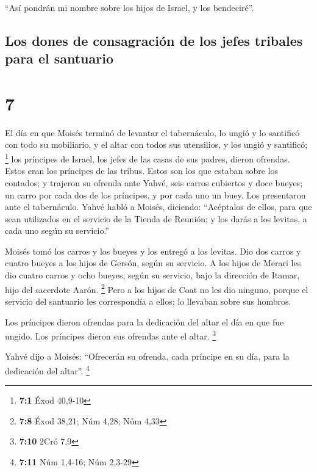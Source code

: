  ``Así pondrán mi nombre sobre los hijos de Israel, y los
bendeciré''.

\hypertarget{los-dones-de-consagraciuxf3n-de-los-jefes-tribales-para-el-santuario}{%
\subsection{Los dones de consagración de los jefes tribales para el
santuario}\label{los-dones-de-consagraciuxf3n-de-los-jefes-tribales-para-el-santuario}}

\hypertarget{section-6}{%
\section{7}\label{section-6}}

 El día en que Moisés terminó de levantar el tabernáculo,
lo ungió y lo santificó con todo su mobiliario, y el altar con todos sus
utensilios, y los ungió y santificó; \footnote{\textbf{7:1} Éxod 40,9-10}
 los príncipes de Israel, los jefes de las casas de sus
padres, dieron ofrendas. Estos eran los príncipes de las tribus. Estos
son los que estaban sobre los contados;  y trajeron su
ofrenda ante Yahvé, seis carros cubiertos y doce bueyes; un carro por
cada dos de los príncipes, y por cada uno un buey. Los presentaron ante
el tabernáculo.  Yahvé habló a Moisés, diciendo:
 ``Acéptalos de ellos, para que sean utilizados en el
servicio de la Tienda de Reunión; y los darás a los levitas, a cada uno
según su servicio.''

 Moisés tomó los carros y los bueyes y los entregó a los
levitas.  Dio dos carros y cuatro bueyes a los hijos de
Gersón, según su servicio.  A los hijos de Merari les dio
cuatro carros y ocho bueyes, según su servicio, bajo la dirección de
Itamar, hijo del sacerdote Aarón. \footnote{\textbf{7:8} Éxod 38,21; Núm
  4,28; Núm 4,33}  Pero a los hijos de Coat no les dio
ninguno, porque el servicio del santuario les correspondía a ellos; lo
llevaban sobre sus hombros.

 Los príncipes dieron ofrendas para la dedicación del
altar el día en que fue ungido. Los príncipes dieron sus ofrendas ante
el altar. \footnote{\textbf{7:10} 2Cró 7,9}

 Yahvé dijo a Moisés: ``Ofrecerán su ofrenda, cada
príncipe en su día, para la dedicación del altar''. \footnote{\textbf{7:11}
  Núm 1,4-16; Núm 2,3-29}

